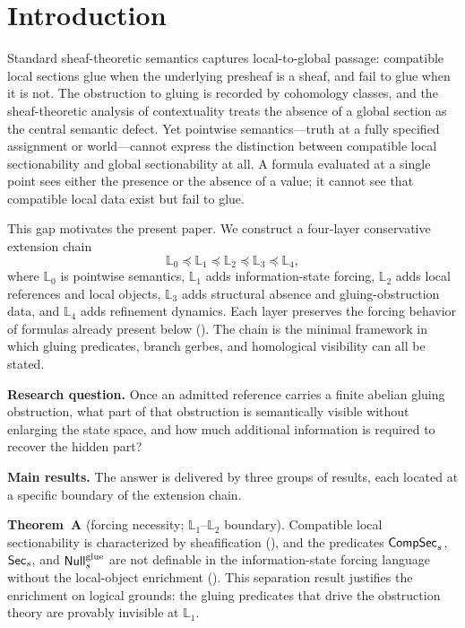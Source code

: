 \section{Introduction}\label{sec:introduction}

Standard sheaf-theoretic semantics captures local-to-global passage: compatible local sections glue when the underlying presheaf is a sheaf, and fail to glue when it is not. The obstruction to gluing is recorded by cohomology classes, and the sheaf-theoretic analysis of contextuality \cite{AbramskyBrandenburger2011} treats the absence of a global section as the central semantic defect. Yet pointwise semantics---truth at a fully specified assignment or world---cannot express the distinction between compatible local sectionability and global sectionability at all. A formula evaluated at a single point sees either the presence or the absence of a value; it cannot see that compatible local data exist but fail to glue.

This gap motivates the present paper. We construct a four-layer conservative extension chain
\[
\mathbb{L}_0 \preceq \mathbb{L}_1 \preceq \mathbb{L}_2 \preceq \mathbb{L}_3 \preceq \mathbb{L}_4,
\]
where $\mathbb{L}_0$ is pointwise semantics, $\mathbb{L}_1$ adds information-state forcing, $\mathbb{L}_2$ adds local references and local objects, $\mathbb{L}_3$ adds structural absence and gluing-obstruction data, and $\mathbb{L}_4$ adds refinement dynamics. Each layer preserves the forcing behavior of formulas already present below (). The chain is the minimal framework in which gluing predicates, branch gerbes, and homological visibility can all be stated.

\medskip
\noindent\textbf{Research question.}
Once an admitted reference carries a finite abelian gluing obstruction, what part of that obstruction is semantically visible without enlarging the state space, and how much additional information is required to recover the hidden part?

\medskip
\noindent\textbf{Main results.}
The answer is delivered by three groups of results, each located at a specific boundary of the extension chain.

\medskip
\noindent\textbf{Theorem~A} (forcing necessity; $\mathbb{L}_1$--$\mathbb{L}_2$ boundary).
Compatible local sectionability is characterized by sheafification (), and the predicates $\mathsf{CompSec}_s$, $\mathsf{Sec}_s$, and $\mathsf{Null}^{\mathrm{glue}}_s$ are not definable in the information-state forcing language without the local-object enrichment (). This separation result justifies the enrichment on logical grounds: the gluing predicates that drive the obstruction theory are provably invisible at $\mathbb{L}_1$.

